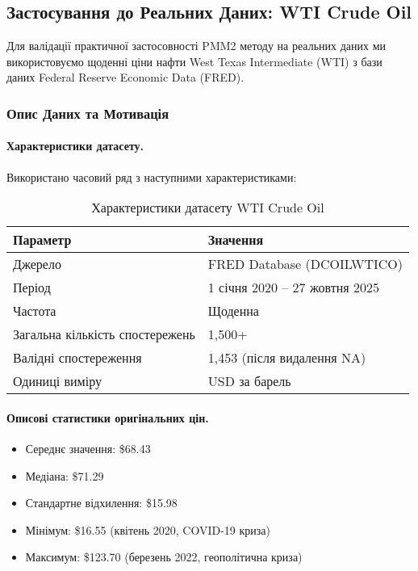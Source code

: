 
\subsection{Застосування до Реальних Даних: WTI Crude Oil}
\label{subsec:wti_application}

Для валідації практичної застосовності PMM2 методу на реальних даних ми використовуємо щоденні ціни нафти West Texas Intermediate (WTI) з бази даних Federal Reserve Economic Data (FRED).

\subsubsection{Опис Даних та Мотивація}
\label{subsubsec:wti_data_description}

\paragraph{Характеристики датасету.}
Використано часовий ряд з наступними характеристиками:

\begin{table}[h]
\centering
\caption{Характеристики датасету WTI Crude Oil}
\label{tab:wti_characteristics}
\begin{tabular}{ll}
\toprule
\textbf{Параметр} & \textbf{Значення} \\
\midrule
Джерело & FRED Database (DCOILWTICO) \\
Період & 1 січня 2020 -- 27 жовтня 2025 \\
Частота & Щоденна \\
Загальна кількість спостережень & 1,500+ \\
Валідні спостереження & 1,453 (після видалення NA) \\
Одиниці виміру & USD за барель \\
\bottomrule
\end{tabular}
\end{table}

\paragraph{Описові статистики оригінальних цін.}
\begin{itemize}
    \item Середнє значення: \$68.43
    \item Медіана: \$71.29
    \item Стандартне відхилення: \$15.98
    \item Мінімум: \$16.55 (квітень 2020, COVID-19 криза)
    \item Максимум: \$123.70 (березень 2022, геополітична криза)
\end{itemize}

